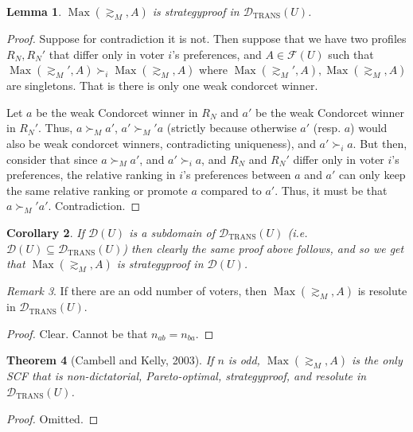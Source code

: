 \documentclass{book}
\theoremstyle{plain}
\newtheorem{theorem}{Theorem}[subsection]
\newtheorem{lemma}[theorem]{Lemma}
\newtheorem{corollary}[theorem]{Corollary}
\theoremstyle{definition}
\theoremstyle{remark}
\newtheorem{remark}[theorem]{Remark}
\begin{document}
\begin{lemma}\label{l:majRelStratProofinTrans}
    $\operatorname{Max}(\gtrsim_M, A)$ is 
    strategyproof in $\mathcal{D}_{\text{TRANS}}(U)$.
\end{lemma}
\begin{proof}
    Suppose for contradiction 
    it is not.
    Then suppose that we have 
    two profiles 
    $R_N, R_N'$ that differ only in voter $i$'s preferences,
    and $A \in \mathcal{F}(U)$ such that
    $\operatorname{Max}(\gtrsim_M', A) \succ_i \operatorname{Max}(\gtrsim_M, A)$
    where $\operatorname{Max}(\gtrsim_M', A), \operatorname{Max}(\gtrsim_M, A)$ are singletons.
    That is there is only one weak condorcet winner.

    Let $a$ be the weak Condorcet winner in $R_N$ and $a'$ be the weak Condorcet winner in $R_N'$.
    Thus, $a \succ_M a'$, $a' \succ_M' a$ (strictly because 
    otherwise $a'$ (resp. $a$) would also be weak 
    condorcet winners, contradicting uniqueness), and $a' \succ_i a$.
    But then, consider that since $a \succ_M a'$, and $a' \succ_i a$, and 
    $R_N$ and $R_N'$ differ only in voter $i$'s preferences, the relative 
    ranking in $i$'s preferences between 
    $a$ and $a'$ can only keep the same relative ranking or promote 
    $a$ compared to $a'$. Thus, it must be that 
    $a \succ_M' a'$. Contradiction.

\end{proof}

\begin{corollary}
    If $\mathcal{D}(U)$ is a subdomain of 
    $\mathcal{D}_{\text{TRANS}}(U)$ (i.e.
    $\mathcal{D}(U) \subseteq \mathcal{D}_{\text{TRANS}}(U)$)
    then clearly the same proof above follows, 
    and so we get that 
    $\operatorname{Max}(\gtrsim_M, A)$ is strategyproof in $\mathcal{D}(U)$.
\end{corollary}


\begin{remark}
    If there are an odd number of voters, 
    then $\operatorname{Max}(\gtrsim_M, A)$ is resolute in $\mathcal{D}_{\text{TRANS}}(U)$.
\end{remark}
\begin{proof}
    Clear. Cannot be that $n_{ab} = n_{ba}$.
\end{proof}

\begin{theorem}[Cambell and Kelly, 2003]
    If $n$ is odd, $\operatorname{Max}(\gtrsim_M, A)$ is the only SCF that is
    non-dictatorial, Pareto-optimal, strategyproof, and
    resolute in $\mathcal{D}_{\text{TRANS}}(U)$.
\end{theorem}
\begin{proof}
    Omitted.
\end{proof}
\end{document}

